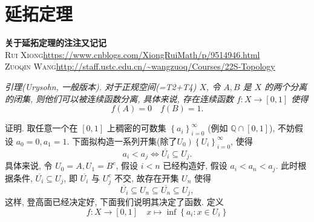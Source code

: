 \documentclass[options]{article}
\begin{document}
\newenvironment{remark}{
	\begin{center}
		\begin{minipage}{0.8\textwidth}\linespread{1.3}\selectfont\itshape}
			{\end{minipage}
	\end{center}
	\vspace*{4pt}}
\newenvironment{en}{}{\switchcolumn}
\newenvironment{cn}{\linespread{1.3}\selectfont}{\switchcolumn*}

\section{延拓定理}

\linespread{1.3}\selectfont
\begin{center}{\bf\Huge{关于延拓定理的注注又记记}}\\
	{{\scshape{Rui Xiong}}\quad\url{https://www.cnblogs.com/XiongRuiMath/p/9514946.html}\\
	{\scshape{Zuoqin Wang}}\quad\url{http://staff.ustc.edu.cn/\~wangzuoq/Courses/22S-Topology}}
\end{center}
\begin{remark}
	引理(Urysohn, 一般版本). 对于正规空间(=T2+T4) $X$, 令 $A, B$ 是 $X$ 的两个分离的闭集, 则他们可以被连续函数分离, 具体来说, 存在连续函数 $f: X \rightarrow[0,1]$ 使得
	\[
			f(A)=0 \quad f(B)=1.
	\]
\end{remark}

证明. 取任意一个在 $[0,1]$ 上稠密的可数集 $\left\{a_i\right\}_{i=0}^{\infty}$ (例如 $\mathbb{Q} \cap[0,1]$), 不妨假设 $a_0=0, a_1=1$. 下面拟构造一系列开集(除了$\left.U_0\right)\left\{U_i\right\}_{i=0}^{\infty}$, 使得
\[
		a_i<a_j \Longleftrightarrow \overline{U_i} \subseteq U_j.
\]
具体来说, 令 $U_0=A, U_1=B^c$, 假设 $i<n$ 已经构造好, 假设 $a_i<a_n<a_j$. 此时根据条件, $\overline{U_i} \subseteq U_j$, 即 $\overline{U_i}$ 与 $U_j^c$ 不交, 故存在开集 $U_n$ 使得
\[
		\overline{U_i} \subseteq U_n \subseteq \overline{U_n} \subseteq U_j,
\]
这样, 登高面已经决定好, 下面我们说明其决定了函数. 定义
\[
		f: X \longrightarrow[0,1] \quad x \longmapsto \inf \left\{a_i: x \in U_i\right\}
\]
\end{document}
